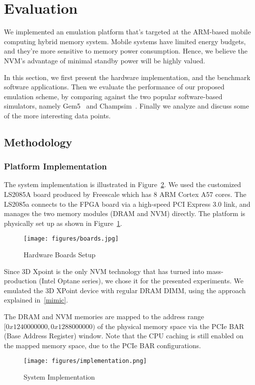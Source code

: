 \documentclass[conference]{IEEEtran}
\begin{document}
\section{Evaluation}
\label{sec:eval}
We implemented an emulation platform that's targeted at the ARM-based mobile computing hybrid memory system. Mobile systems have limited energy budgets, and they're more sensitive to memory power consumption. Hence, we believe the NVM's advantage of minimal standby power will be highly valued.\par 
In this section,
we first present the hardware implementation, and the benchmark software applications. Then
we evaluate the performance of our proposed emulation scheme, by comparing against the two popular software-based simulators, namely Gem5~\cite{gem5} and Champsim~\cite{champsim}. Finally we analyze and discuss some of the
more interesting data points.

\subsection{Methodology}
\label{sec:method}
\subsubsection{Platform Implementation}
The system implementation is illustrated in Figure~\ref{fig:implementation}.
We used the customized LS2085A board produced by Freescale which has 8 ARM Cortex A57 cores. The LS2085a connects to the FPGA board via a high-speed PCI Express 3.0 link, and manages the two
memory modules (DRAM and NVM) directly. The platform is physically set up as shown in Figure~\ref{fig:boards}.
\begin{figure}[!hbt]
\centerline{\texttt{[image: figures/boards.jpg]}}
\caption{Hardware Boards Setup}
\label{fig:boards}
\end{figure}
Since 3D Xpoint is the only NVM technology that has turned into mass-production (Intel Optane series), we chose it for the presented experiments. We emulated the 3D XPoint device with regular DRAM DIMM, using the approach explained in~\ref{mimic}.\par
The DRAM and NVM memories are
mapped to the address range $[0x1240000000, 0x1288000000)$ of the physical memory space via the PCIe BAR (Base Address
Register) window. Note that the CPU caching is still enabled on the mapped memory space, due to the PCIe BAR configurations.
\begin{figure}[!hbt]
\centerline{\texttt{[image: figures/implementation.png]}}
\caption{System Implementation}
\label{fig:implementation}
\end{figure}
\end{document}
